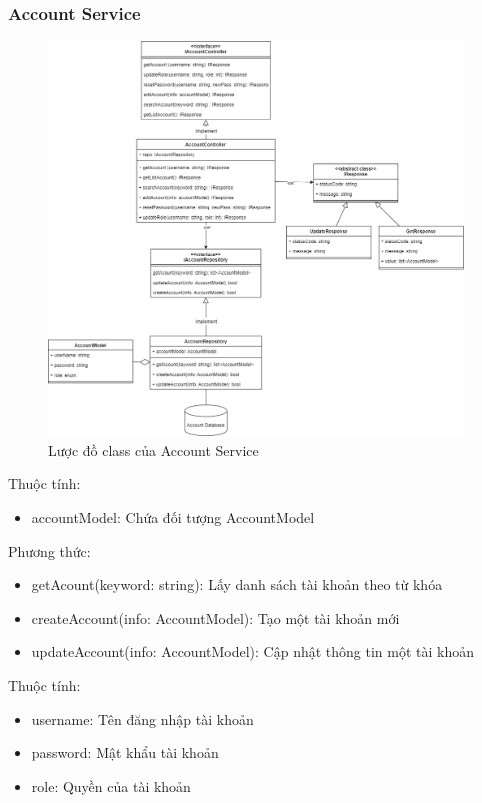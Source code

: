 \subsubsection{Account Service}
\begin{figure}[!htp]
	\centering
	\includegraphics[width=11cm]{img/Architecture/service/AccountService.png}
	\newline
	\caption{Lược đồ class của Account Service}
\end{figure}

Thuộc tính:
\begin{itemize}
	\item accountModel: Chứa đối tượng AccountModel
\end{itemize}
Phương thức:
\begin{itemize}
	\item getAcount(keyword: string): Lấy danh sách tài khoản theo từ khóa
	\item createAccount(info: AccountModel): Tạo một tài khoản mới
	\item updateAccount(info: AccountModel): Cập nhật thông tin một tài khoản
\end{itemize}

Thuộc tính:
\begin{itemize}
	\item username: Tên đăng nhập tài khoản
	\item password: Mật khẩu tài khoản
	\item role: Quyền của tài khoản
\end{itemize}

